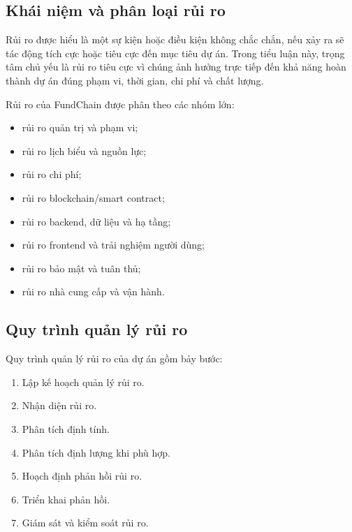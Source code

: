 \subsection{Khái niệm và phân loại rủi ro}

Rủi ro được hiểu là một sự kiện hoặc điều kiện không chắc chắn, nếu xảy ra sẽ tác động tích cực hoặc tiêu cực đến mục tiêu dự án. Trong tiểu luận này, trọng tâm chủ yếu là rủi ro tiêu cực vì chúng ảnh hưởng trực tiếp đến khả năng hoàn thành dự án đúng phạm vi, thời gian, chi phí và chất lượng.

Rủi ro của FundChain được phân theo các nhóm lớn:

\begin{itemize}
  \item rủi ro quản trị và phạm vi;
  \item rủi ro lịch biểu và nguồn lực;
  \item rủi ro chi phí;
  \item rủi ro blockchain/smart contract;
  \item rủi ro backend, dữ liệu và hạ tầng;
  \item rủi ro frontend và trải nghiệm người dùng;
  \item rủi ro bảo mật và tuân thủ;
  \item rủi ro nhà cung cấp và vận hành.
\end{itemize}

\subsection{Quy trình quản lý rủi ro}

Quy trình quản lý rủi ro của dự án gồm bảy bước:

\begin{enumerate}
  \item Lập kế hoạch quản lý rủi ro.
  \item Nhận diện rủi ro.
  \item Phân tích định tính.
  \item Phân tích định lượng khi phù hợp.
  \item Hoạch định phản hồi rủi ro.
  \item Triển khai phản hồi.
  \item Giám sát và kiểm soát rủi ro.
\end{enumerate}


